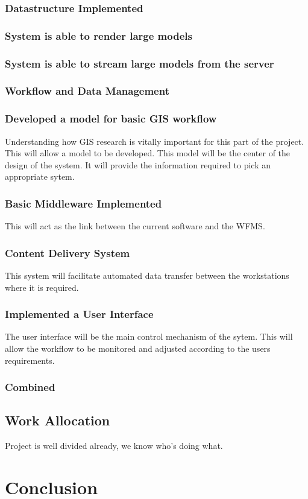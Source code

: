 \documentclass[12pt,a4paper]{article}
\begin{document}
\subsubsection*{Datastructure Implemented}
\subsubsection*{System is able to render large models}
\subsubsection*{System is able to stream large models from the server}
\subsubsection{Workflow and Data Management}
\subsubsection*{Developed a model for basic GIS workflow}
Understanding how GIS research is vitally important for this part of
the project. This will allow a model to be developed. This model will
be the center of the design of the system. It will provide the
information required to pick an appropriate sytem.
\subsubsection*{Basic Middleware Implemented}
This will act as the link between the current software and the WFMS.
\subsubsection*{Content Delivery System}
This system will facilitate automated data transfer between the workstations
where it is required.
\subsubsection*{Implemented a User Interface}
The user interface will be the main control mechanism of the sytem. This
will allow the workflow to be monitored and adjusted according to the users
requirements.
\subsubsection{Combined}
\subsection{Work Allocation}
Project is well divided already, we know who's doing what.
\section{Conclusion}






\end{document}
